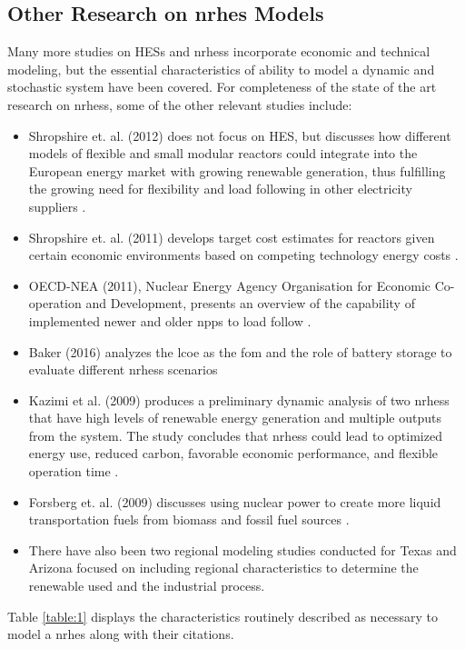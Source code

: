 \subsection{Other Research on \ac{nrhes} Models}
Many more studies on HESs and \ac{nrhess} incorporate economic and technical modeling, but the essential characteristics of ability to model a dynamic and stochastic system have been covered. For completeness of the state of the art research on \ac{nrhess}, some of the other relevant studies include:
\begin{itemize}
\item Shropshire et. al. (2012) does not focus on HES, but discusses how different models of flexible and small modular reactors could integrate into the European energy market with growing renewable generation, thus fulfilling the growing need for flexibility and load following in other electricity suppliers \cite{Shropshire2012}.
\item Shropshire et. al. (2011) develops target cost estimates for reactors given certain economic environments based on competing technology energy costs \cite{Shropshire2011}.
\item OECD-NEA (2011), Nuclear Energy Agency Organisation for Economic Co-operation and Development, presents an overview of the capability of implemented newer and older \ac{npp}s to load follow \cite{Nuclear2011}.
\item Baker (2016) analyzes the \ac{lcoe} as the \ac{fom} and the role of battery storage to evaluate different \ac{nrhess} scenarios \cite{Baker2016}
\item Kazimi et al. (2009) produces a preliminary dynamic analysis of two \ac{nrhess} that have high levels of renewable energy generation and multiple outputs from the system. The study concludes that \ac{nrhess} could lead to optimized energy use, reduced carbon, favorable economic performance, and flexible operation time \cite{Kazimi}.
\item Forsberg et. al. (2009) discusses using nuclear power to create more liquid transportation fuels from biomass and fossil fuel sources \cite{Forsberg2009}.
\item There have also been two regional modeling studies conducted for Texas and Arizona focused on including regional characteristics to determine the renewable used and the industrial process\cite{Garcia2015}.
\end{itemize}
Table \ref{table:1} displays the characteristics routinely described as necessary to model a \ac{nrhes} along with their citations.

